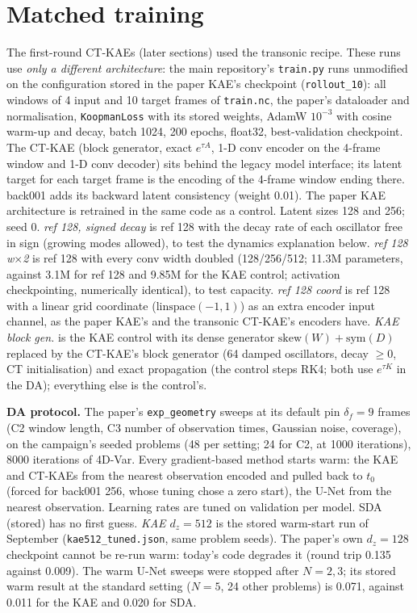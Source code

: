 \documentclass[10pt]{article}
\begin{document}
\section*{Matched training}
The first-round CT-KAEs (later sections) used the transonic recipe. These runs use \emph{only a
different architecture}: the main repository's \texttt{train.py} runs unmodified on the
configuration stored in the paper KAE's checkpoint (\texttt{rollout\_10}): all windows of 4
input and 10 target frames of \texttt{train.nc}, the paper's dataloader and normalisation,
\texttt{KoopmanLoss} with its stored weights, AdamW $10^{-3}$ with cosine warm-up and decay,
batch 1024, 200 epochs, float32, best-validation checkpoint. The CT-KAE (block generator, exact
$e^{\tau A}$, 1-D conv encoder on the 4-frame window and 1-D conv decoder) sits behind the legacy
model interface; its latent target for each target frame is the encoding of the 4-frame window
ending there. back001 adds its backward latent consistency (weight 0.01). The paper KAE
architecture is retrained in the same code as a control. Latent sizes 128 and 256; seed 0.
\emph{ref 128, signed decay} is ref 128 with the decay rate of each oscillator free in sign
(growing modes allowed), to test the dynamics explanation below. \emph{ref 128 w$\times$2} is
ref 128 with every conv width doubled (128/256/512; 11.3M parameters, against 3.1M for ref 128 and
9.85M for the KAE control; activation checkpointing, numerically identical), to test capacity.
\emph{ref 128 coord} is ref 128 with a linear grid coordinate ($\mathrm{linspace}(-1, 1)$) as an
extra encoder input channel, as the paper KAE's and the transonic CT-KAE's encoders have.
\emph{KAE block gen.} is the KAE control with its dense generator $\mathrm{skew}(W) + \mathrm{sym}(D)$
replaced by the CT-KAE's block generator (64 damped oscillators, decay $\ge 0$, CT
initialisation) and exact propagation (the control steps RK4; both use $e^{\tau K}$ in the DA);
everything else is the control's.

\textbf{DA protocol.} The paper's \texttt{exp\_geometry} sweeps at its default pin $\delta_f = 9$
frames (C2 window length, C3 number of observation times, Gaussian noise, coverage), on the
campaign's seeded problems (48 per setting; 24 for C2, at 1000 iterations), 8000 iterations of
4D-Var. Every gradient-based method starts warm: the KAE and CT-KAEs from the nearest observation
encoded and pulled back to $t_0$ (forced for back001 256, whose tuning chose a zero start), the
U-Net from the nearest observation. Learning rates are tuned on validation per model. SDA (stored)
has no first guess. \emph{KAE $d_z = 512$} is the stored warm-start run of September
(\texttt{kae512\_tuned.json}, same problem seeds). The paper's own $d_z = 128$ checkpoint cannot be
re-run warm: today's code degrades it (round trip 0.135 against 0.009). The warm U-Net sweeps were
stopped after $N = 2, 3$; its stored warm result at the standard setting ($N = 5$, 24 other
problems) is 0.071, against 0.011 for the KAE and 0.020 for SDA.
\end{document}
